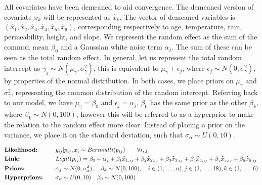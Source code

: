 \documentclass[11pt]{article}
\begin{document}
All covariates have been demeaned to aid convergence. The demeaned version of covariate $x_k$ will be represented as $\widehat{x}_k$. The vector of demeaned variables is 
$(\widehat{x}_{1}, \widehat{x}_{2},\widehat{x}_{3}, \widehat{x}_{4}, \widehat{x}_{5}, \widehat{x}_{6})$, corresponding respectively to age, temperature, rain, permeability, height, and slope. We represent the random effect as the sum of the common mean $\beta_0$ and a Gaussian white noise term $\alpha_j$. The sum of these can be seen as the total random effect. In general, let us represent the total random intercept as $\gamma_j \sim N(\mu_\gamma, \sigma^2_\gamma)$, this is equivalent to $\mu_\gamma + \epsilon_j$, where $\epsilon_j \sim N(0, \sigma^2_\gamma)$, by properties of the normal distribution. In both cases, we place priors on $\mu_\gamma$ and $\sigma^2_\gamma$, representing the common distribution of the random intercept. Referring back to our model, we have $\mu_\gamma = \beta_0$ and $\epsilon_j = \alpha_j$. $\beta_0$ has the same prior as the other $\beta_k$, where $\beta_k \sim N(0, 100)$, however this will be referred to as a hyperprior to make the relation to the random effect more clear. Instead of placing a prior on the variance, we place it on the standard deviation, such that $\sigma_\alpha \sim U(0, 10)$. 

\begin{align*}
&\text{\textbf{Likelihood:}} \qquad &&y_{ij} | p_{ij}, x_i \sim Bernoulli(p_{ij}) \qquad \forall i, j\\
&\text{\textbf{Link:}} \qquad &&Logit(p_{ij}) = \beta_0 + \alpha_j + \beta_1 \widehat{x}_{1, ij} + \beta_2 \widehat{x}_{2, ij} + \beta_3 \widehat{x}_{3, ij} + \beta_4 \widehat{x}_{4, ij} + \beta_5 \widehat{x}_{5, ij} + \beta_6 \widehat{x}_{6, ij} \\
&\text{\textbf{Priors:}}        &&\alpha_j \sim N(0, \sigma^2_\alpha),  \quad \beta_k \sim N(0, 100), \quad i \in (1, \dots, n), j \in (1, \dots, 18), k \in (1, \dots, 6)\\
&\text{\textbf{Hyperpriors:}} &&\sigma_\alpha \sim U(0, 10) \quad \beta_0 \sim N(0, 100)
\end{align*}
\end{document}
